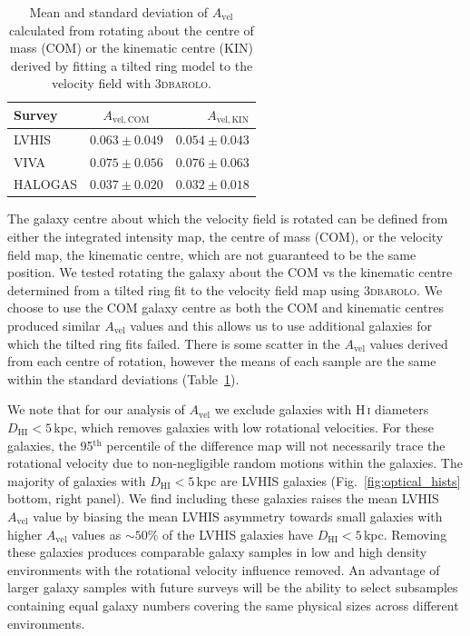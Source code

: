 \documentclass[fleqn,usenatbib]{mnras}
\begin{document}
\begin{table}
	\centering
    \caption{Mean and standard deviation of $A_{\mathrm{vel}}$ calculated from rotating about the centre of mass (COM) or the kinematic centre (KIN) derived by fitting a tilted ring model to the velocity field with \textsc{3dbarolo}.}
	\label{table:wmad_params}
	\begin{tabular}{lcr}
		\hline
		Survey & $A_{\mathrm{vel,COM}}$ & $A_{\mathrm{vel,KIN}}$ \\ \hline
		LVHIS   & $0.063\pm0.049$ & $0.054\pm0.043$ \\
		VIVA    & $0.075\pm0.056$ & $0.076\pm0.063$ \\
		HALOGAS & $0.037\pm0.020$ & $0.032\pm0.018$ \\ \hline
	\end{tabular}
\end{table}

The galaxy centre about which the velocity field is rotated can be defined from either the integrated intensity map, the centre of mass (COM), or the velocity field map, the kinematic centre, which are not guaranteed to be the same position. We tested rotating the galaxy about the COM vs the kinematic centre determined from a tilted ring fit to the velocity field map using \textsc{3dbarolo}. We choose to use the COM galaxy centre as both the COM and kinematic centres produced similar $A_{\mathrm{vel}}$ values and this allows us to use additional galaxies for which the tilted ring fits failed. There is some scatter in the $A_{\mathrm{vel}}$ values derived from each centre of rotation, however the means of each sample are the same within the standard deviations (Table~\ref{table:wmad_params}). 

We note that for our analysis of $A_{\mathrm{vel}}$ we exclude galaxies with H\,\textsc{i} diameters $D_{\mathrm{HI}}<5$\,kpc, which removes galaxies with low rotational velocities. For these galaxies, the 95$^{\mathrm{th}}$ percentile of the difference map will not necessarily trace the rotational velocity due to non-negligible random motions within the galaxies. The majority of galaxies with $D_{\mathrm{HI}}<5$\,kpc are LVHIS galaxies (Fig.~\ref{fig:optical_hists} bottom, right panel). We find including these galaxies raises the mean LVHIS $A_{\mathrm{vel}}$ value by biasing the mean LVHIS asymmetry towards small galaxies with higher $A_{\mathrm{vel}}$ values as $\sim50\%$ of the LVHIS galaxies have $D_{\mathrm{HI}}<5$\,kpc. Removing these galaxies produces comparable galaxy samples in low and high density environments with the rotational velocity influence removed. An advantage of larger galaxy samples with future surveys will be the ability to select subsamples containing equal galaxy numbers covering the same physical sizes across different environments.
\end{document}
